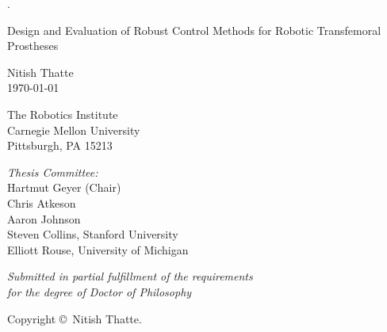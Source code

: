 \documentclass{tufte-book}
\title{\proposaltitle}
\author[Nitish Thatte]{Nitish Thatte}
\newcommand{\proposaltitle}{Design and Evaluation of Robust Control Methods for
Robotic Transfemoral Prostheses}
\begin{document}

\begin{titlepage}
	\begin{fullwidth}
	\centering
    \phantom.
    \vspace{0.5in}
    {\huge{\proposaltitle}\par}
    \vspace{0.5in}
    
    Nitish Thatte \\
    \today \\
    \vspace{0.9 in}
    
    The Robotics Institute \\
    Carnegie Mellon University \\
    Pittsburgh, PA 15213
    \vspace{0.9 in}
    
   	{\it Thesis Committee:}\\
    Hartmut Geyer (Chair)\\
    Chris Atkeson\\
    Aaron Johnson\\
    Steven Collins, Stanford University\\
    Elliott Rouse, University of Michigan\\
    \vspace{0.9 in}
   
   	{\it Submitted in partial fulfillment of the requirements\\ for the degree of Doctor of Philosophy}\\
    \vspace{0.9 in}
    
    Copyright \copyright \the\year \ Nitish Thatte.
 	\end{fullwidth}
\end{titlepage}

%

\tableofcontents

\listoffigures

\listoftables


\mainmatter











\backmatter



\end{document}
